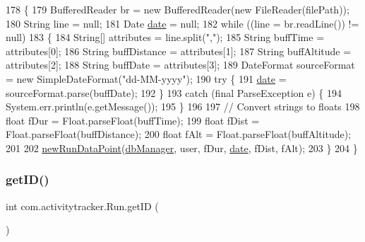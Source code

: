 \begin{DoxyCode}
178                                                       \{
179         BufferedReader br = \textcolor{keyword}{new} BufferedReader(\textcolor{keyword}{new} FileReader(filePath));
180         String line = null;
181         Date \mbox{\hyperlink{classcom_1_1activitytracker_1_1_run_a66934b1f4fe6bc74a4e98574a2892764}{date}} = null;
182         \textcolor{keywordflow}{while} ((line = br.readLine()) != null)  
183         \{
184             String[] attributes = line.split(\textcolor{stringliteral}{","});
185             String buffTime = attributes[0];
186             String buffDistance = attributes[1];
187             String buffAltitude = attributes[2];
188             String buffDate = attributes[3];
189             DateFormat sourceFormat = \textcolor{keyword}{new} SimpleDateFormat(\textcolor{stringliteral}{"dd-MM-yyyy"});
190             \textcolor{keywordflow}{try} \{
191                 \mbox{\hyperlink{classcom_1_1activitytracker_1_1_run_a66934b1f4fe6bc74a4e98574a2892764}{date}} = sourceFormat.parse(buffDate);
192             \}
193             \textcolor{keywordflow}{catch} (\textcolor{keyword}{final} ParseException e) \{
194                 System.err.println(e.getMessage());
195             \}
196 
197             \textcolor{comment}{// Convert strings to floats}
198             \textcolor{keywordtype}{float} fDur = Float.parseFloat(buffTime);
199             \textcolor{keywordtype}{float} fDist = Float.parseFloat(buffDistance);
200             \textcolor{keywordtype}{float} fAlt = Float.parseFloat(buffAltitude);
201 
202             \mbox{\hyperlink{classcom_1_1activitytracker_1_1_run_a5dea6f1860431103d553ce770382afe0}{newRunDataPoint}}(\mbox{\hyperlink{classcom_1_1activitytracker_1_1_run_ab90e32eda9f4c671ae3575f971edca6b}{dbManager}}, user, fDur, \mbox{\hyperlink{classcom_1_1activitytracker_1_1_run_a66934b1f4fe6bc74a4e98574a2892764}{date}}, fDist, fAlt);
203         \} 
204     \}
\end{DoxyCode}
\mbox{\label{classcom_1_1activitytracker_1_1_run_a61916c14ab5a2bf6b080200f7d0c5566}} 
\subsubsection{\texorpdfstring{get\+I\+D()}{getID()}}
{\footnotesize\ttfamily int com.\+activitytracker.\+Run.\+get\+ID (\begin{DoxyParamCaption}{ }\end{DoxyParamCaption})}



